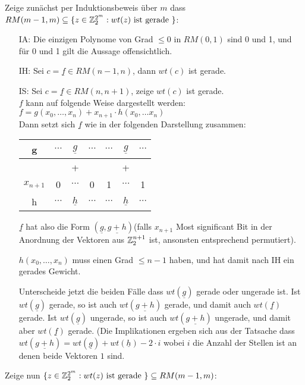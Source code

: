 Zeige zunächst per Induktionsbeweis über $m$ dass $RM(m-1,m) \subseteq \lbrace z \in \mathbb{Z}^{2^m}_2 : wt(z) \text{ ist gerade } \rbrace$:
\begin{itemize}
	\item[IA:] Die einzigen Polynome von Grad $\leq 0$ in $RM(0,1)$ sind 0 und 1, und für 0 und 1 gilt die Aussage offensichtlich.
	\item[IH:] Sei $c = \underline{f} \in RM(n-1,n)$, dann $wt(c)$ ist gerade.
	\item[IS:] Sei $c = \underline{f} \in RM(n,n+1)$, zeige $wt(c)$ ist gerade.\\
	$f$ kann auf folgende Weise dargestellt werden:\\
	$f = g(x_0,\ldots,x_n) + x_{n+1}\cdot h(x_0,\ldots x_n)$\\
	Dann setzt sich $\underline{f}$ wie in der folgenden Darstellung zusammen:\\
	\begin{tabular}{|c|ccc|ccc|}
	\hline 
	g & $\cdots$ & $\underline{g}$ & $\cdots$ & $\cdots$ & $\underline{g}$ & $\cdots$ \\ 
	\hline 
	 &  & + &  &  & + &  \\ 
	\hline 
	$x_{n+1}$ & 0 & $\cdots$ & 0 & 1 & $\cdots$ & 1 \\ 
	\hline 
	h & $\cdots$ & $\underline{h}$ & $\cdots$ & $\cdots$ & $\underline{h}$ & $\cdots$ \\ 
	\hline
	\end{tabular}
	
	$\underline{f}$ hat also die Form $(\underline{g}, \underline{g+h})$(falls $x_{n+1}$ Most significant Bit in der Anordnung der Vektoren aus $\mathbb{Z}_2^{n+1}$ ist, ansonsten entsprechend permutiert).\medskip
	
	$h(x_0,\ldots,x_n)$ muss einen Grad $\leq n-1$ haben, und hat damit nach IH ein gerades Gewicht.\medskip
	
	Unterscheide jetzt die beiden Fälle dass $wt(\underline{g})$ gerade oder ungerade ist.
	Ist $wt(\underline{g})$ gerade, so ist auch $wt(\underline{g+h})$ gerade, und damit auch $wt(\underline{f})$ gerade.
	Ist $wt(\underline{g})$ ungerade, so ist auch $wt(\underline{g+h})$ ungerade, und damit aber $wt(\underline{f})$ gerade.
	(Die Implikationen ergeben sich aus der Tatsache dass $wt(\underline{g + h}) = wt(\underline{g}) + wt(\underline{h}) - 2 \cdot i$ wobei $i$ die Anzahl der Stellen ist an denen beide Vektoren $1$ sind.
\end{itemize}

Zeige nun $\lbrace z \in \mathbb{Z}^{2^m}_2 : wt(z) \text{ ist gerade } \rbrace \subseteq RM(m-1,m)$:

